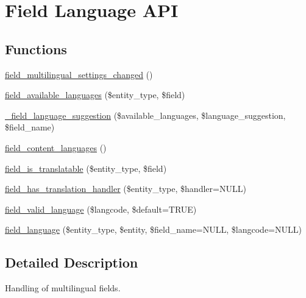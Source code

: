 \hypertarget{group__field__language}{
\section{Field Language API}
\label{group__field__language}
}
\subsection*{Functions}
\begin{DoxyCompactItemize}
\item 
\hyperlink{group__field__language_gafbd7a022815887d2aadf983656571e98}{field\_\-multilingual\_\-settings\_\-changed} ()
\item 
\hyperlink{group__field__language_ga3dbd9611836d9bba15c15f0a8ae83c9b}{field\_\-available\_\-languages} (\$entity\_\-type, \$field)
\item 
\hyperlink{group__field__language_gaf7105831bb68e11809f92c990b50fb6c}{\_\-field\_\-language\_\-suggestion} (\$available\_\-languages, \$language\_\-suggestion, \$field\_\-name)
\item 
\hyperlink{group__field__language_ga78c369e7b76edbb662d8f2e04bc82ad4}{field\_\-content\_\-languages} ()
\item 
\hyperlink{group__field__language_gae2315cbfa6724de32eeea9e06a1811a7}{field\_\-is\_\-translatable} (\$entity\_\-type, \$field)
\item 
\hyperlink{group__field__language_ga56d98c14a956746f91373b68b404a66b}{field\_\-has\_\-translation\_\-handler} (\$entity\_\-type, \$handler=NULL)
\item 
\hyperlink{group__field__language_ga3c8ddbf445782a8ac352279c606aa30c}{field\_\-valid\_\-language} (\$langcode, \$default=TRUE)
\item 
\hyperlink{group__field__language_gaff79088cd3951d2127adad1a2c13ad3e}{field\_\-language} (\$entity\_\-type, \$entity, \$field\_\-name=NULL, \$langcode=NULL)
\end{DoxyCompactItemize}


\subsection{Detailed Description}
Handling of multilingual fields.

